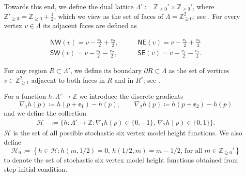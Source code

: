 \documentclass[reqno,11pt]{amsart}
\numberwithin{equation}{section}
\theoremstyle{definition}
\newcommand{\Z}{\mathbb{Z}}
\begin{document}
Towards this end, we define  the dual lattice $\Lambda' :=  \mathbb{Z}_{\ge0}' \times \mathbb{Z}_{\ge0}'$, where $\mathbb{Z}'_{\ge0}=\mathbb{Z}_{\ge0}+\frac{1}{2}$, which we view as the set of faces of $\Lambda=\Z_{\ge 0}^2$; see .
For every vertex $v \in \Lambda$ its adjacent faces are defined as
\begin{center}
    \begin{minipage}[c]{0.3\textwidth}
        \centering
    \end{minipage}
    \begin{minipage}[c]{0.6\textwidth}
        \centering
        \begin{equation}
        \label{dir}
        \begin{split}
            \mathsf{NW}(v) = v - \frac{\mathbb{e}_1}{2} + \frac{\mathbb{e}_2}{2},
            \qquad
            &\mathsf{NE}(v) = v + \frac{\mathbb{e}_1}{2} + \frac{\mathbb{e}_2}{2}
            \\
            \mathsf{SW}(v) = v - \frac{\mathbb{e}_1}{2} - \frac{\mathbb{e}_2}{2},
            \qquad
            &\mathsf{SE}(v) = v + \frac{\mathbb{e}_1}{2} - \frac{\mathbb{e}_2}{2}.
        \end{split}
        \end{equation}
    \end{minipage}
\end{center}
For any region $R \subset \Lambda'$, we define its boundary $\partial R \subset \Lambda$ as the set of vertices $v \in \mathbb{Z}_{\ge 1}^2$ adjacent to both faces in $R$ and in $R^\mathrm{c}$; see .

{For a function $h:\Lambda' \to \Z$ we introduce the discrete gradients
\begin{equation*}
    \nabla_1 h(p) \coloneqq h(p + \mathbb{e}_1) - h(p),
    \qquad
    \nabla_2 h(p) \coloneqq h(p + \mathbb{e}_2) - h(p)
\end{equation*}
and we define the collection
\begin{align}
    \mathscr{H} & :=\Big\{ h : \Lambda' \to \mathbb{Z} : \nabla_1 h(p) \in \{0,-1\}, \, \nabla_2 h(p) \in \{0,1\}\Big\}.
\end{align}
}
$\mathscr{H}$ is the set of all possible stochastic six vertex model height functions. We also define
    \begin{equation}\label{eq: H0}
        \mathscr{H}_0 := \left\{ h \in \mathscr{H} : h(m,1/2) = 0, \, h(1/2,m) = m-1/2, \, \text{for all } m \in \mathbb{Z}_{\ge 0}' \right\}
    \end{equation}
    to denote the set of stochastic six vertex model height functions obtained from step initial condition.
\end{document}
